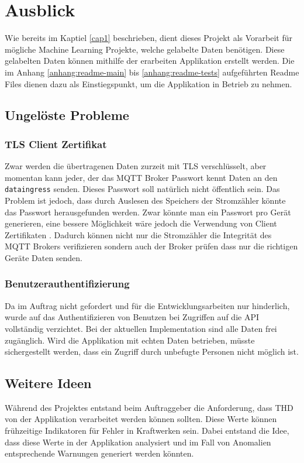 \chapter{Ausblick}
Wie bereits im Kaptiel \ref{cap1} beschrieben, dient dieses Projekt als Vorarbeit für mögliche
Machine Learning Projekte, welche gelabelte Daten benötigen.
Diese gelabelten Daten können mithilfe der erarbeiten Applikation erstellt werden.
Die im Anhang \ref{anhang:readme-main} bis \ref{anhang:readme-tests} aufgeführten Readme Files dienen dazu als Einstiegspunkt,
um die Applikation in Betrieb zu nehmen.



\section{Ungelöste Probleme}

\subsection{\ac{TLS} Client Zertifikat}

Zwar werden die übertragenen Daten zurzeit mit \ac{TLS} verschlüsselt, aber
momentan kann jeder, der das \ac{MQTT} Broker Passwort kennt Daten an den
\texttt{dataingress} senden. Dieses Passwort soll natürlich nicht öffentlich sein.
Das Problem ist jedoch, dass durch Auslesen des Speichers der Stromzähler
könnte das Passwort herausgefunden werden.
Zwar könnte man ein Passwort pro Gerät generieren, eine bessere Möglichkeit
wäre jedoch die Verwendung von Client Zertifikaten \parencite{rfc5246_2021}.
Dadurch können nicht nur die Stromzähler die Integrität des \ac{MQTT} Brokers
verifizieren sondern auch der Broker prüfen dass nur die richtigen Geräte
Daten senden.

\subsection{Benutzerauthentifizierung}
Da im Auftrag nicht gefordert und für die Entwicklungsarbeiten nur hinderlich,
wurde auf das Authentifizieren von Benutzen bei Zugriffen auf die \ac{API} vollständig verzichtet.
Bei der aktuellen Implementation sind alle Daten frei zugänglich.
Wird die Applikation mit echten Daten betrieben, müsste sichergestellt werden, dass ein Zugriff durch unbefugte
Personen nicht möglich ist.



\section{Weitere Ideen}
Während des Projektes entstand beim Auftraggeber die Anforderung, dass \ac{THD} von der Applikation
verarbeitet werden können sollten. Diese Werte können frühzeitige Indikatoren für Fehler in Kraftwerken sein.
Dabei entstand die Idee, dass diese Werte in der Applikation analysiert
und im Fall von Anomalien entsprechende Warnungen generiert werden könnten.

